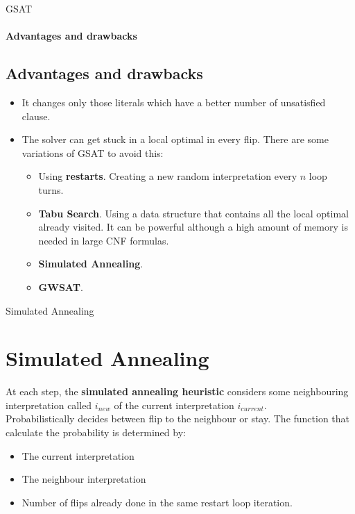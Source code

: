 \documentclass{beamer}
\begin{document}
\begin{frame}{GSAT}
\framesubtitle{Advantages and drawbacks}
\subsection{Advantages and drawbacks}
\begin{itemize}
	\item It changes only those literals which have a better number of unsatisfied clause. 
	\item The solver can get stuck in a local optimal in every flip. There are some variations of GSAT to avoid this:
	\begin{itemize}
		\item Using \textbf{restarts}. Creating a new random interpretation every $n$ loop turns.
		\item \textbf{Tabu Search}. Using a data structure that contains all the local optimal already visited. It can be powerful although a high amount of memory is needed in large CNF formulas.
		\item \textbf{Simulated Annealing}.
		\item \textbf{GWSAT}.
		
	\end{itemize}
\end{itemize}
\end{frame}

\begin{frame}{Simulated Annealing}
\section{Simulated Annealing}
\begin{flushleft}

At each step, the \textbf{simulated annealing heuristic }considers some neighbouring interpretation called $i_{new}$ of the current interpretation $i_{current}$.
\\


Probabilistically decides between flip to the neighbour or stay. The function that calculate the probability is determined by:
\end{flushleft}
\begin{itemize}
	\item The current interpretation
	\item The neighbour interpretation
	\item Number of flips already done in the same restart loop iteration.
\end{itemize}
\end{frame}
\end{document}
